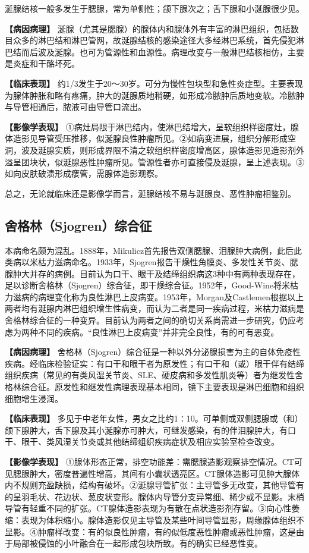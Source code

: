 涎腺结核一般多发生于腮腺，常为单侧性；颌下腺次之；舌下腺和小涎腺很少见。

\textbf{【病因病理】}
涎腺（尤其是腮腺）的腺体内和腺体外有丰富的淋巴组织，包括数目众多的淋巴结和淋巴管网，故涎腺结核的感染途径大多经淋巴系统，首先侵犯淋巴结而后波及涎腺。也可为管源性和血源性。病理改变与一般淋巴结核相仿，主要是炎症和干酪坏死。

\textbf{【临床表现】}
约1/3发生于20～30岁。可分为慢性包块型和急性炎症型。主要表现为腺体肿胀和略有疼痛，肿大的涎腺质地稍硬，如形成冷脓肿后质地变软。冷脓肿与导管相通后，脓液可由导管口流出。

\textbf{【影像学表现】}
①病灶局限于淋巴结内，使淋巴结增大，呈软组织样密度灶，腺体造影见导管受压推移，似涎腺良性肿瘤所见。②如病变进展，组织分解形成空洞，波及涎腺实质，则形成界限不清之软组织样密度增高区，腺体造影见造影剂外溢呈团块状，似涎腺恶性肿瘤所见。管源性者亦可直接侵及涎腺，呈上述表现。③如向皮肤破溃形成瘘管，需腺体造影观察。

总之，无论就临床还是影像学而言，涎腺结核不易与涎腺良、恶性肿瘤相鉴别。

\subsection{舍格林（Sjogren）综合征}

本病命名颇为混乱。1888年，Mikulicz首先报告双侧腮腺、泪腺肿大病例，此后此类病以米枯力滋病命名。1933年，Sjogren报告干燥性角膜炎、多发性关节炎、腮腺肿大并存的病例。目前认为口干、眼干及结缔组织病这3种中有两种表现存在，足以诊断舍格林（Sjogren）综合征，即干燥综合征。1952年，Good-Wine将米枯力滋病的病理变化称为良性淋巴上皮病变。1953年，Morgan及Castlemen根据以上两者均有涎腺内淋巴组织增生性病变，而认为二者是同一疾病过程，米枯力滋病是舍格林综合征的一种变异。目前认为两者之间的确切关系尚需进一步研究，仍应考虑为两种不同的疾病。“良性淋巴上皮病变”并非完全良性，有的可有恶变。

\textbf{【病因病理】}
舍格林（Sjogren）综合征是一种以外分泌腺损害为主的自体免疫性疾病。经临床检验证实：有口干和眼干者为原发性；有口干和（或）眼干伴有结缔组织疾病（常见的有类风湿关节炎、SLE、硬皮病和多发性肌炎等）者为继发性舍格林综合征。原发性和继发性病理表现基本相同，镜下主要表现是淋巴细胞和组织细胞增生浸润。

\textbf{【临床表现】}
多见于中老年女性，男女之比约1∶10。可单侧或双侧腮腺或（和）颌下腺肿大，舌下腺及其小涎腺亦可肿大，可继发感染，有的伴泪腺肿大，有口干、眼干、类风湿关节炎或其他结缔组织疾病症状及相应实验室检查改变。

\textbf{【影像学表现】}
①腺体形态正常，排空功能差：需腮腺造影观察排空情况。CT可见腮腺肿大，密度普遍性增高，其间有小囊状透亮区。CT腺体造影可见肿大腺体内不规则充盈缺损，结构有破坏。②涎腺导管扩张：主导管多无改变，其他导管有的呈羽毛状、花边状、葱皮状变形。腺体内导管分支异常细、稀少或不显影。末梢导管有轻重不同的扩张。CT腺体造影表现为有散在点状造影剂存留。③向心性萎缩：表现为体积缩小。腺体造影仅见主导管及某些叶间导管显影，周缘腺体组织不显影。④肿瘤样改变：有的似良性肿瘤，有的似低度恶性肿瘤或恶性肿瘤，这是由于局部被侵蚀的小叶融合在一起形成包块所致。有的确实已经恶性变。

